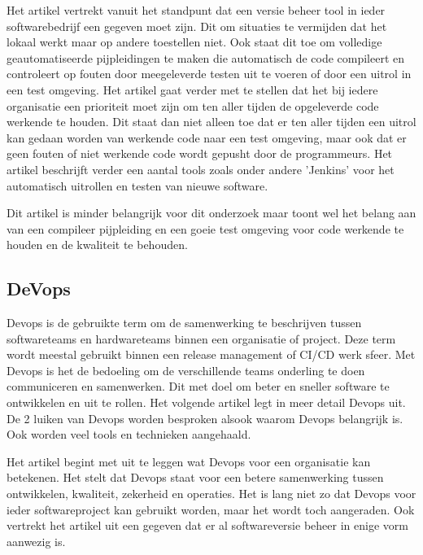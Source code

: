 Het artikel \autocite{Meyer2014} vertrekt vanuit het standpunt dat een versie beheer tool in ieder softwarebedrijf een gegeven moet zijn. Dit om situaties te vermijden dat het lokaal werkt maar op andere toestellen niet. Ook staat dit toe om volledige geautomatiseerde pijpleidingen te maken die automatisch de code compileert en controleert op fouten door meegeleverde testen uit te voeren of door een uitrol in een test omgeving. Het artikel gaat verder met te stellen dat het bij iedere organisatie een prioriteit moet zijn om ten aller tijden de opgeleverde code werkende te houden. Dit staat dan niet alleen toe dat er ten aller tijden een uitrol kan gedaan worden van werkende code naar een test omgeving, maar ook dat er geen fouten of niet werkende code wordt gepusht door de programmeurs. Het artikel beschrijft verder een aantal tools zoals onder andere 'Jenkins' voor het automatisch uitrollen en testen van nieuwe software.

Dit artikel \autocite{Meyer2014} is minder belangrijk voor dit onderzoek maar toont wel het belang aan van een compileer pijpleiding en een goeie test omgeving voor code werkende te houden en de kwaliteit te behouden.

\subsection{DeVops}
Devops is de gebruikte term om de samenwerking te beschrijven tussen softwareteams en hardwareteams binnen een organisatie of project. Deze term wordt meestal gebruikt binnen een release management of CI/CD werk sfeer. Met Devops is het de bedoeling om de verschillende teams onderling te doen communiceren en samenwerken. Dit met doel om beter en sneller software te ontwikkelen en uit te rollen. Het volgende artikel \autocite{Ebert2016} legt in meer detail Devops uit. De 2 luiken van Devops worden besproken alsook waarom Devops belangrijk is. Ook worden veel tools en technieken aangehaald.

Het artikel \autocite{Ebert2016} begint met uit te leggen wat Devops voor een organisatie kan betekenen. Het stelt dat Devops staat voor een betere samenwerking tussen ontwikkelen, kwaliteit, zekerheid en operaties. Het is lang niet zo dat Devops voor ieder softwareproject kan gebruikt worden, maar het wordt toch aangeraden. Ook vertrekt het artikel uit een gegeven dat er al softwareversie beheer in enige vorm aanwezig is.

